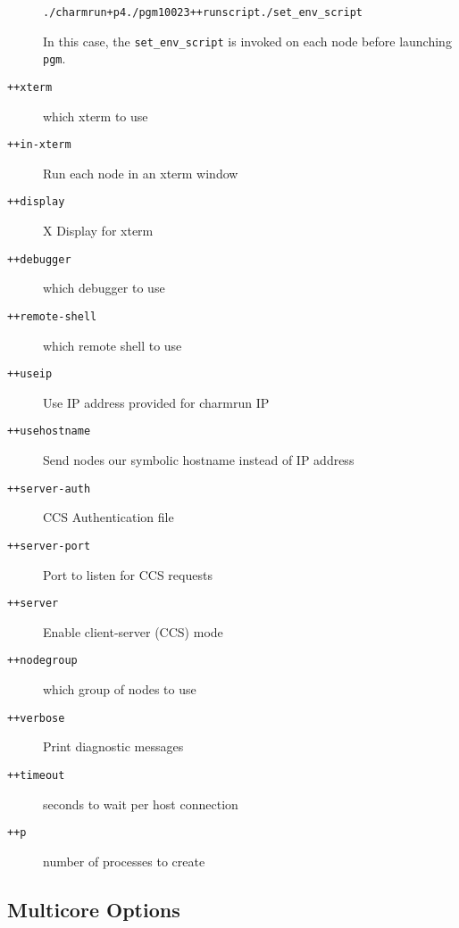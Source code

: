 \begin{description}
\begin{alltt}
./charmrun +p4 ./pgm 100 2 3 ++runscript ./set\_env\_script
\end{alltt}

In this case, the {\tt set\_env\_script} is invoked on each node before launching {\tt pgm}.

\item[{\tt ++xterm}]            which xterm to use

\item[{\tt ++in-xterm}]         Run each node in an xterm window

\item[{\tt ++display}]          X Display for xterm

\item[{\tt ++debugger}]         which debugger to use

\item[{\tt ++remote-shell}]     which remote shell to use

\item[{\tt ++useip}]            Use IP address provided for charmrun IP

\item[{\tt ++usehostname}]      Send nodes our symbolic hostname instead of IP address



\item[{\tt ++server-auth}]      CCS Authentication file

\item[{\tt ++server-port}]      Port to listen for CCS requests

\item[{\tt ++server}]           Enable client-server (CCS) mode

\item[{\tt ++nodegroup}]        which group of nodes to use

\item[{\tt ++verbose}]          Print diagnostic messages

\item[{\tt ++timeout}]          seconds to wait per host connection

\item[{\tt ++p}]                number of processes to create

\end{description}

\subsection{Multicore Options}

